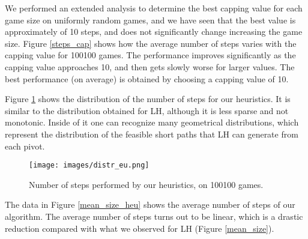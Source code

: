 \documentclass[11pt]{article}
\begin{document}
We performed an extended analysis to determine the best capping
value for each game size on uniformly random games, and we have seen
that the best value is approximately of 10 steps, and does not
significantly change increasing the game size. Figure
\ref{steps_cap} shows how the average number of steps varies with
the capping value for 100100 games. The performance improves
significantly as the capping value approaches 10, and then gets
slowly worse for larger values. The best performance (on average) is
obtained by choosing a capping value of 10.

Figure \ref{100all_heu} shows the distribution of the number of
steps for our heuristics. It is similar to the distribution obtained
for LH, although it is less sparse and not monotonic. Inside of it
one can recognize many geometrical distributions, which represent
the distribution of the feasible short paths that LH can generate
from each pivot.

\begin{figure}[h]
\centering
\texttt{[image: images/distr\_eu.png]}
\caption{Number of steps performed by our heuristics, on
100100 games.}
\label{100all_heu}
\end{figure}

The data in Figure \ref{mean_size_heu} shows the average number of
steps of our algorithm. The average number of steps turns out to be
linear, which is a drastic reduction compared with what we observed
for LH (Figure \ref{mean_size}).
\end{document}
